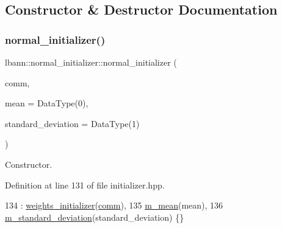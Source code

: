 \subsection{Constructor \& Destructor Documentation}
\mbox{\label{classlbann_1_1normal__initializer_a6db5f5aeedb4a314d36bc3106bda6b56}} 
\subsubsection{\texorpdfstring{normal\+\_\+initializer()}{normal\_initializer()}}
{\footnotesize\ttfamily lbann\+::normal\+\_\+initializer\+::normal\+\_\+initializer (\begin{DoxyParamCaption}\item[{\hyperlink{classlbann_1_1lbann__comm}{lbann\+\_\+comm} $\ast$}]{comm,  }\item[{Data\+Type}]{mean = {\ttfamily DataType(0)},  }\item[{Data\+Type}]{standard\+\_\+deviation = {\ttfamily DataType(1)} }\end{DoxyParamCaption})\hspace{0.3cm}{\ttfamily [inline]}}

Constructor. 

Definition at line 131 of file initializer.\+hpp.


\begin{DoxyCode}
134     : \hyperlink{classlbann_1_1weights__initializer_a3b65043cb6d76dcfcb07387392429755}{weights\_initializer}(\hyperlink{file__io_8cpp_ab048c6f9fcbcfaa57ce68b00263dbebe}{comm}),
135       \hyperlink{classlbann_1_1normal__initializer_a1e431c0576605984c7e56d4ce905632e}{m\_mean}(mean),
136       \hyperlink{classlbann_1_1normal__initializer_a69cebd0d8f6db811c6195a1dac447a3e}{m\_standard\_deviation}(standard\_deviation) \{\}
\end{DoxyCode}
\mbox{\label{classlbann_1_1normal__initializer_a8177a93cb80b6fb916af8c9e2fec0c74}} 

